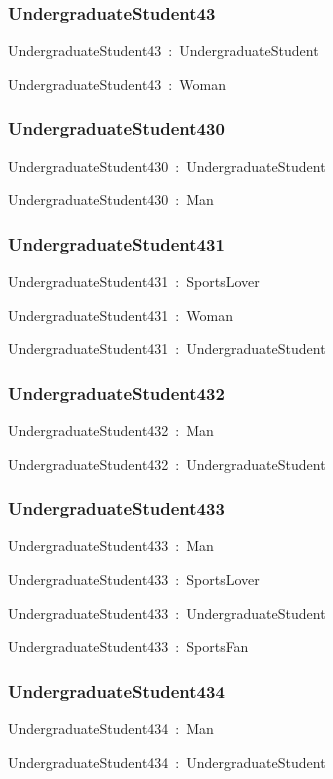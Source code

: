 \documentclass{article}
\begin{document}
\subsubsection*{UndergraduateStudent43}

UndergraduateStudent43~:~UndergraduateStudent

UndergraduateStudent43~:~Woman

\subsubsection*{UndergraduateStudent430}

UndergraduateStudent430~:~UndergraduateStudent

UndergraduateStudent430~:~Man

\subsubsection*{UndergraduateStudent431}

UndergraduateStudent431~:~SportsLover

UndergraduateStudent431~:~Woman

UndergraduateStudent431~:~UndergraduateStudent

\subsubsection*{UndergraduateStudent432}

UndergraduateStudent432~:~Man

UndergraduateStudent432~:~UndergraduateStudent

\subsubsection*{UndergraduateStudent433}

UndergraduateStudent433~:~Man

UndergraduateStudent433~:~SportsLover

UndergraduateStudent433~:~UndergraduateStudent

UndergraduateStudent433~:~SportsFan

\subsubsection*{UndergraduateStudent434}

UndergraduateStudent434~:~Man

UndergraduateStudent434~:~UndergraduateStudent
\end{document}
